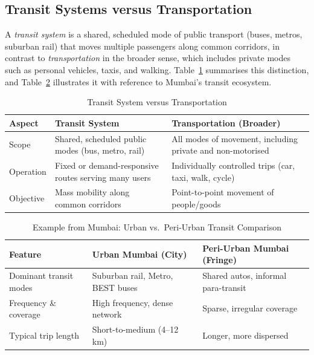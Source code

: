 \documentclass[12pt]{article}
\begin{document}
\subsection{Transit Systems versus Transportation}

A \textit{transit system} is a shared, scheduled mode of public transport (buses,
metros, suburban rail) that moves multiple passengers along common corridors, in
contrast to \textit{transportation} in the broader sense, which includes private
modes such as personal vehicles, taxis, and walking. Table~\ref{tab:transit-vs-transportation}
summarises this distinction, and Table~\ref{tab:mumbai-example} illustrates it with
reference to Mumbai's transit ecosystem.

\begin{table}[H]
\centering
\caption{Transit System versus Transportation}
\label{tab:transit-vs-transportation}
\small
\begin{tabular}{p{3.6cm}p{5.1cm}p{5.1cm}}
\toprule
\textbf{Aspect} & \textbf{Transit System} & \textbf{Transportation (Broader)} \\
\midrule
Scope & Shared, scheduled public modes (bus, metro, rail) & All modes of movement, including private and non-motorised \\
Operation & Fixed or demand-responsive routes serving many users & Individually controlled trips (car, taxi, walk, cycle) \\
Objective & Mass mobility along common corridors & Point-to-point movement of people/goods \\
\bottomrule
\end{tabular}
\end{table}

\begin{table}[H]
\centering
\caption{Example from Mumbai: Urban vs.\ Peri-Urban Transit Comparison}
\label{tab:mumbai-example}
\small
\begin{tabular}{p{4cm}p{5.1cm}p{5.1cm}}
\toprule
\textbf{Feature} & \textbf{Urban Mumbai (City)} & \textbf{Peri-Urban Mumbai (Fringe)} \\
\midrule
Dominant transit modes & Suburban rail, Metro, BEST buses & Shared autos, informal para-transit \\
Frequency \& coverage & High frequency, dense network & Sparse, irregular coverage \\
Typical trip length & Short-to-medium (4--12 km) & Longer, more dispersed \\
\bottomrule
\end{tabular}
\end{table}
\end{document}
